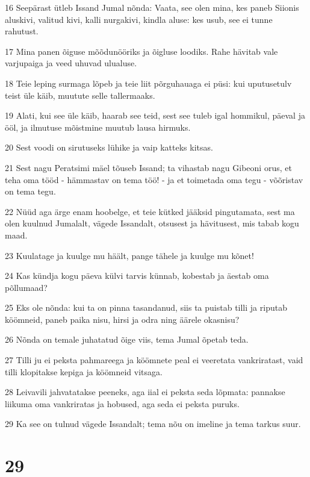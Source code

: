 \par 16 Seepärast ütleb Issand Jumal nõnda: Vaata, see olen mina, kes paneb Siionis aluskivi, valitud kivi, kalli nurgakivi, kindla aluse: kes usub, see ei tunne rahutust.
\par 17 Mina panen õiguse mõõdunööriks ja õigluse loodiks. Rahe hävitab vale varjupaiga ja veed uhuvad ulualuse.
\par 18 Teie leping surmaga lõpeb ja teie liit põrguhauaga ei püsi: kui uputusetulv teist üle käib, muutute selle tallermaaks.
\par 19 Alati, kui see üle käib, haarab see teid, sest see tuleb igal hommikul, päeval ja ööl, ja ilmutuse mõistmine muutub lausa hirmuks.
\par 20 Sest voodi on sirutuseks lühike ja vaip katteks kitsas.
\par 21 Sest nagu Peratsimi mäel tõuseb Issand; ta vihastab nagu Gibeoni orus, et teha oma tööd - hämmastav on tema töö! - ja et toimetada oma tegu - võõristav on tema tegu.
\par 22 Nüüd aga ärge enam hoobelge, et teie kütked jääksid pingutamata, sest ma olen kuulnud Jumalalt, vägede Issandalt, otsusest ja hävitusest, mis tabab kogu maad.
\par 23 Kuulatage ja kuulge mu häält, pange tähele ja kuulge mu kõnet!
\par 24 Kas kündja kogu päeva külvi tarvis künnab, kobestab ja äestab oma põllumaad?
\par 25 Eks ole nõnda: kui ta on pinna tasandanud, siis ta puistab tilli ja riputab köömneid, paneb paika nisu, hirsi ja odra ning äärele okasnisu?
\par 26 Nõnda on temale juhatatud õige viis, tema Jumal õpetab teda.
\par 27 Tilli ju ei peksta pahmareega ja köömnete peal ei veeretata vankriratast, vaid tilli klopitakse kepiga ja köömneid vitsaga.
\par 28 Leivavili jahvatatakse peeneks, aga iial ei peksta seda lõpmata: pannakse liikuma oma vankriratas ja hobused, aga seda ei peksta puruks.
\par 29 Ka see on tulnud vägede Issandalt; tema nõu on imeline ja tema tarkus suur.

\chapter{29}

